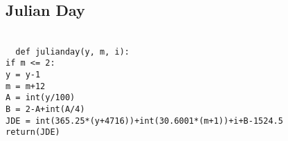 \subsection{Julian Day}
\label{app:jday}
\texttt{ \\
~~def julian\textunderscore day(y, m, i):\\
 \indent if m <= 2:\\
 \indent \indent y = y-1\\
 \indent \indent m = m+12\\
 \indent A = int(y/100)\\
 \indent B = 2-A+int(A/4)\\
 \indent JDE = int(365.25*(y+4716))+int(30.6001*(m+1))+i+B-1524.5
\\
 \indent return(JDE)\\
}

